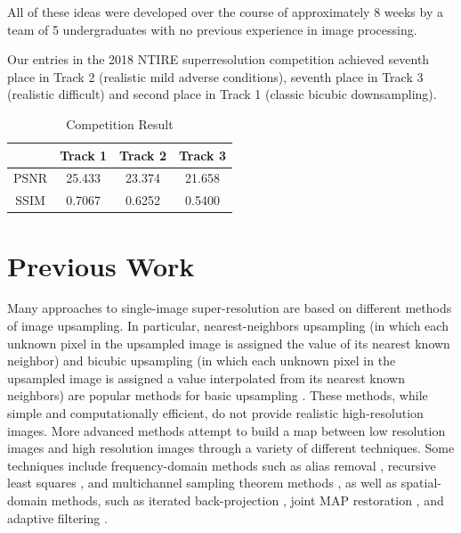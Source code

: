 \documentclass[10pt,twocolumn,letterpaper]{article}
\begin{document}
All of these ideas were developed over the course of approximately 8 weeks by a team of 5 undergraduates with no previous experience in image processing.

Our entries in the 2018 NTIRE superresolution competition \cite{Timofte_2018_CVPR_Workshops} achieved seventh place in Track 2 (realistic mild adverse conditions), seventh place in Track 3 (realistic difficult) and second place in Track 1 (classic bicubic downsampling). 
\begin{table}[ht]
    \centering
    \begin{tabular}{c|c|c|c}
         & Track 1 & Track 2 & Track 3\\ \hline
         PSNR & 25.433 & 23.374 & 21.658\\
         SSIM & 0.7067 & 0.6252 & 0.5400
    \end{tabular}
    \caption{Competition Result}
    \label{tab:my_label}
\end{table}

\section{Previous Work}
Many approaches to single-image super-resolution are based on different methods of image upsampling. In particular, nearest-neighbors upsampling (in which each unknown pixel in the upsampled image is assigned the value of its nearest known neighbor) and bicubic upsampling (in which each unknown pixel in the upsampled image is assigned a value interpolated from its nearest known neighbors) are popular methods for basic upsampling \cite{babu2011survey,gilman2006near}. These methods, while simple and computationally efficient, do not provide realistic high-resolution images. More advanced methods attempt to build a map between low resolution images and high resolution images through a variety of different techniques. Some techniques include frequency-domain methods such as alias removal \cite{tsai1984multiframe}, recursive least squares \cite{kim1990recursive}, and multichannel sampling theorem methods \cite{ur1992improved}, as well as spatial-domain methods, such as iterated back-projection \cite{irani1993motion}, joint MAP restoration \cite{hardie1997joint}, and adaptive filtering \cite{patti1998new}.
\end{document}
